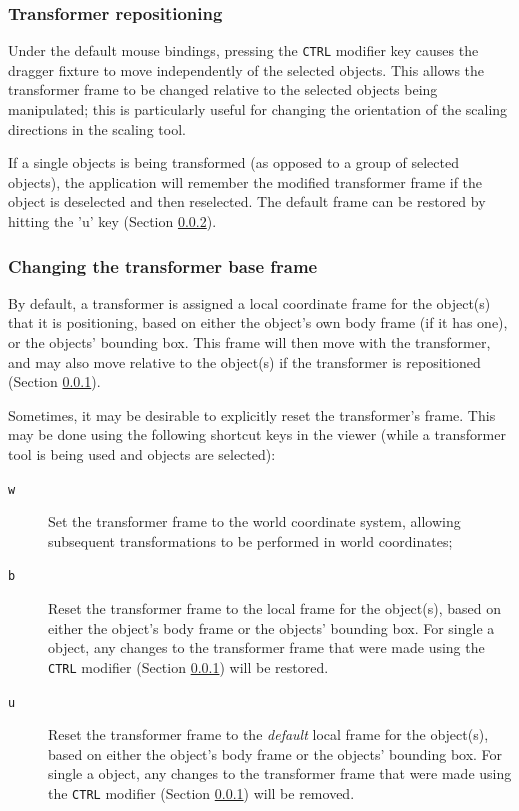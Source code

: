 \documentclass{article}
\begin{document}
\subsubsection{Transformer repositioning}
\label{ChangingTransformerPose}

Under the default mouse bindings, pressing the {\tt CTRL} modifier key
causes the dragger fixture to move independently of the selected
objects. This allows the transformer frame to be changed relative to
the selected objects being manipulated; this is particularly useful
for changing the orientation of the scaling directions in the scaling
tool.

If a single objects is being transformed (as opposed to a group of
selected objects), the application will remember the modified
transformer frame if the object is deselected and then reselected. The
default frame can be restored by hitting the 'u' key (Section
\ref{ChangingTransformerBaseFrame:sec}).

\subsubsection{Changing the transformer base frame}
\label{ChangingTransformerBaseFrame:sec}

By default, a transformer is assigned a local coordinate frame for the
object(s) that it is positioning, based on either the object's own
body frame (if it has one), or the objects' bounding box. This frame
will then move with the transformer, and may also move relative to the
object(s) if the transformer is repositioned (Section
\ref{ChangingTransformerPose}).

Sometimes, it may be desirable to explicitly reset the transformer's
frame. This may be done using the following shortcut keys in the
viewer (while a transformer tool is being used and objects are
selected):

\begin{description}

\item[{\tt w}]\mbox{}

Set the transformer frame to the world coordinate system, allowing
subsequent transformations to be performed in world coordinates;

\item[{\tt b}]\mbox{}

Reset the transformer frame to the local frame for the object(s),
based on either the object's body frame or the objects' bounding box.
For single a object, any changes to the transformer frame that were
made using the {\tt CTRL} modifier (Section
\ref{ChangingTransformerPose}) will be restored.

\item[{\tt u}]\mbox{}

Reset the transformer frame to the {\it default} local frame for the
object(s), based on either the object's body frame or the objects'
bounding box.  For single a object, any changes to the transformer
frame that were made using the {\tt CTRL} modifier (Section
\ref{ChangingTransformerPose}) will be removed.

\end{description}
\end{document}

